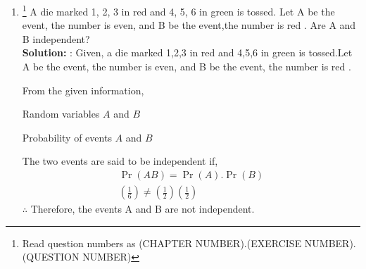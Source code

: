 \documentclass{article}
\newcommand{\solution}{\noindent \textbf{Solution: }}
\providecommand{\pr}[1]{\ensuremath{\Pr\left(#1\right)}}
\numberwithin{table}{enumi}
\begin{document}
\begin{enumerate}[label=13.\arabic{enumi}.\arabic{enumii}]
\setcounter{enumi}{1}
\setcounter{enumii}{5}
\item \footnote{Read question numbers as (CHAPTER NUMBER).(EXERCISE NUMBER).(QUESTION NUMBER)}
A die marked 1, 2, 3 in red and 4, 5, 6 in green is tossed. Let A be the event,
the number is even, and B be the event,the number is red . Are A and B
independent?\\
\solution:
Given, a die marked 1,2,3 in red and 4,5,6 in green is tossed.Let A be the event,
the number is even, and B be the event, the number is red .

From the given information,

\begin{table}[h]
\centering

	 \caption{Random variables $A$ and $B$}
	 \label{table:1}   
\end{table}

\begin{table}[h]
\centering

	 \caption{Probability of events $A$ and $B$}
	 \label{table:2}   
\end{table}
The two events are said to be independent if,
\begin{align}
\pr{AB} = \pr{A}.\pr{B}\\
\left(\frac{1}{6}\right) \neq \left(\frac{1}{2}\right)\left(\frac{1}{2}\right)
\end{align}
$\therefore$ Therefore, the events A and B are not independent.
\end{enumerate}
\end{document}
